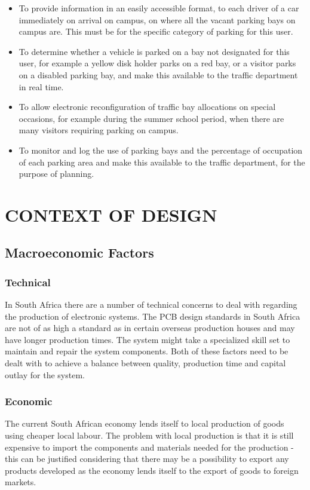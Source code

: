 \begin{itemize}
\item To provide information in an easily accessible format, to each driver of a car immediately on arrival on campus, on where all the vacant parking bays on campus are. This must be for the specific category of parking for this user.

\item To determine whether a vehicle is parked on a bay not designated for this user, for example a yellow disk holder parks on a red bay, or a visitor parks on a disabled parking bay, and make this available to the traffic department in real time.

\item To  allow electronic reconfiguration  of  traffic  bay allocations  on  special  occasions, for example during the summer school period, when there are many visitors requiring parking on campus.

\item To monitor and log the use of parking bays and the percentage of occupation of each parking area and make this available to the traffic department, for the purpose of planning.\cite{assignment}
\end{itemize}



\newpage
\section{CONTEXT OF DESIGN}
\subsection{Macroeconomic Factors}
\subsubsection{Technical} 
In South Africa there are a number of technical concerns to deal with regarding the production of electronic systems. The PCB design standards in South Africa are not of as high a standard as in certain overseas production houses and may have longer production times. The system might take a specialized skill set to maintain and repair the system components. Both of these factors need to be dealt with to achieve a balance between quality, production time and capital outlay for the system.

\subsubsection{Economic}
The current South African economy lends itself to local production of goods using cheaper local labour. The problem with local production is that it is still expensive to import the components and materials needed for the production - this can be justified considering that there may be a possibility to export any products developed as the economy lends itself to the export of goods to foreign markets. 

